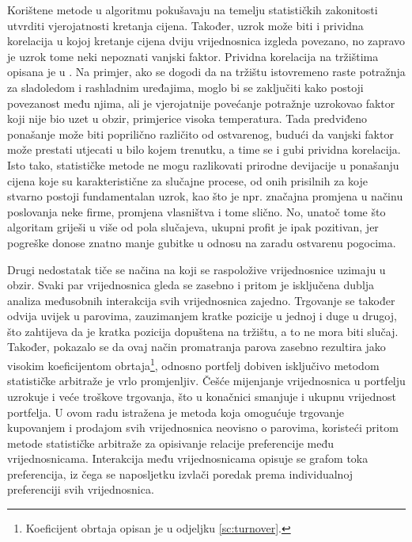 \documentclass[lmodern, utf8, diplomski, numeric]{fer}
\begin{document}
  Korištene metode u algoritmu pokušavaju na temelju statističkih zakonitosti utvrditi vjerojatnosti kretanja cijena.
  Također, uzrok može biti i prividna korelacija  u kojoj kretanje cijena dviju vrijednosnica izgleda povezano, no zapravo je uzrok tome neki nepoznati vanjski faktor.
  Prividna korelacija na tržištima opisana je u \citep{spurious}.
  Na primjer, ako se dogodi da na tržištu istovremeno raste potražnja za sladoledom i rashladnim uređajima, moglo bi se zaključiti kako postoji povezanost među njima, ali je vjerojatnije povećanje potražnje uzrokovao faktor koji nije bio uzet u obzir, primjerice visoka temperatura.
  Tada predviđeno ponašanje može biti poprilično različito od ostvarenog, budući da vanjski faktor može prestati utjecati u bilo kojem trenutku, a time se i gubi prividna korelacija.
  Isto tako, statističke metode ne mogu razlikovati prirodne devijacije u ponašanju cijena koje su karakteristične za slučajne procese, od onih prisilnih za koje stvarno postoji fundamentalan uzrok, kao što je npr. značajna promjena u načinu poslovanja neke firme, promjena vlasništva i tome slično.
  No, unatoč tome što algoritam griješi u više od pola slučajeva, ukupni profit je ipak pozitivan, jer pogreške donose znatno manje gubitke u odnosu na zaradu ostvarenu pogocima.
  
  Drugi nedostatak tiče se načina na koji se raspoložive vrijednosnice uzimaju u obzir.
  Svaki par vrijednosnica gleda se zasebno i pritom je isključena dublja analiza međusobnih interakcija svih vrijednosnica zajedno.
  Trgovanje se također odvija uvijek u parovima, zauzimanjem kratke pozicije u jednoj i duge u drugoj, što zahtijeva da je kratka pozicija dopuštena na tržištu, a to ne mora biti slučaj.
  Također, pokazalo se da ovaj način promatranja parova zasebno rezultira jako visokim koeficijentom obrtaja\footnote{Koeficijent obrtaja opisan je u odjeljku \ref{sc:turnover}.}, odnosno portfelj dobiven isključivo metodom statističke arbitraže je vrlo promjenljiv.
  Češće mijenjanje vrijednosnica u portfelju uzrokuje i veće troškove trgovanja, što u konačnici smanjuje i ukupnu vrijednost portfelja.
  U ovom radu istražena je metoda koja omogućuje trgovanje kupovanjem i prodajom svih vrijednosnica neovisno o parovima, koristeći pritom metode statističke arbitraže za opisivanje relacije preferencije među vrijednosnicama.
  Interakcija među vrijednosnicama opisuje se grafom toka preferencija, iz čega se naposljetku izvlači poredak prema individualnoj preferenciji svih vrijednosnica.
  
\end{document}
